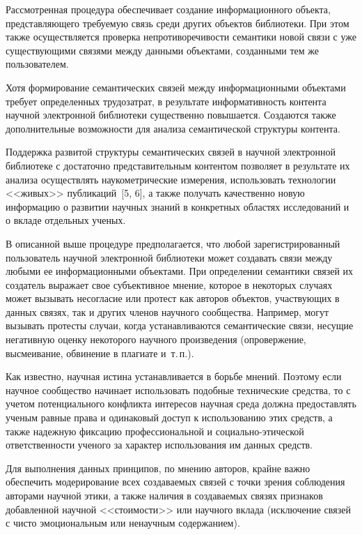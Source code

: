 \begin{multicols}{2}
  Рассмотренная процедура обеспечивает создание информационного объекта, 
представляющего требуемую связь среди других объектов библиотеки. При 
этом также осуществляется проверка непротиворечивости семантики новой 
связи с уже существующими связями между данными объектами, созданными 
тем же пользователем. 
  
  Хотя формирование семантических связей между информационными 
объектами требует определенных трудозатрат, в результате информативность 
контента научной электронной библиотеки существенно повышается. 
Создаются также дополнительные возможности для анализа семантической 
структуры контента. 
  
  Поддержка развитой структуры семантических связей в научной электронной 
библиотеке с достаточно представительным контентом позволяет в результате 
их анализа осуществлять наукометрические измерения, использовать 
технологии <<живых>> публикаций~[5, 6], а также получать качественно 
новую информацию о развитии научных знаний в конкретных областях 
исследований и о вкладе отдельных ученых.
  
  В описанной выше процедуре предполагается, что любой 
зарегистрированный пользователь научной электронной библиотеки может 
создавать связи между любыми ее информационными объектами. При 
определении семантики связей их создатель выражает свое субъективное 
мнение, которое в некоторых случаях может вызывать несогласие или протест 
как авторов объектов, участвующих в данных связях, так и других членов 
научного сообщества. Например, могут вызывать протесты случаи, когда 
устанавливаются семантические связи, несущие негативную оценку некоторого 
научного произведения (опровержение, высмеивание, обвинение в плагиате 
и~т.\,п.). 
  
  Как известно, научная истина устанавливается в борьбе мнений. Поэтому 
если научное сообщество начинает использовать подобные технические 
средства, то с учетом потенциального конфликта интересов научная среда 
должна предоставлять ученым равные права и одинаковый доступ к 
использованию этих средств, а также надежную фиксацию профессиональной и 
социально-этической ответственности ученого за характер использования им 
данных средств.
  
  Для выполнения данных принципов, по мнению авторов, крайне важно 
обеспечить модерирование всех создаваемых связей с точки зрения соблюдения 
авторами научной этики, а также наличия в создаваемых связях признаков 
добавленной научной <<стоимости>> или научного вклада (исключение связей 
с чисто эмоциональным или ненаучным содержанием). 
  

\end{multicols}
